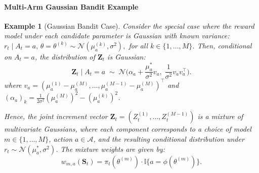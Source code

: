 \documentclass[12pt]{article}
\newtheorem{example}{Example}
\begin{document}
\paragraph{Multi-Arm Gaussian Bandit Example}
\label{app:B:multiarm}
\begin{example}[Gaussian Bandit Case]
    Consider the special case where the reward model under each candidate parameter is Gaussian with known variance: $r_t \mid A_t = a,\, \theta = \theta^{(k)} \sim \mathcal{N}(\mu^{(k)}_a, \sigma^2),$ for all $k \in \{1, \ldots, M\}$. Then, conditional on $A_t=a$, the distribution of $\mathbf{Z}_t$ is Gaussian:
    \[
    \mathbf Z_t \mid A_t=a \;\sim\; \mathcal{N}\!\Big(\alpha_a+\frac{\mu_a^\ast}{\sigma^2}v_a,\; \frac{1}{\sigma^2}v_a v_a^\top\Big).
    \]
    where $v_a=(\mu_a^{(1)}-\mu_a^{(M)},\ldots,\mu_a^{(M-1)}-\mu_a^{(M)})^\top$ and $(\alpha_a)_k=\frac{1}{2\sigma^2} (\mu_a^{(M)})^2-(\mu_a^{(k)})^2$.

    Hence, the joint increment vector $\mathbf{Z}_t = (Z_t^{(1)}, \ldots, Z_t^{(M-1)})$ is a mixture of multivariate Gaussians, where each component corresponds to a choice of model $m \in \{1, \ldots, M\}$, action $a \in \mathcal{A}$, and the resulting conditional distribution under $r_t \sim \mathcal{N}(\mu^*_a, \sigma^2)$. The mixture weights are given by:
    \[
    w_{m,a}(\mathbf{S}_t) = \pi_t(\theta^{(m)}) \cdot \mathbb{I}\{a = \phi(\theta^{(m)})\}.
    \]
    \label{example:gaussian-bandit-case}
\end{example}
\end{document}
